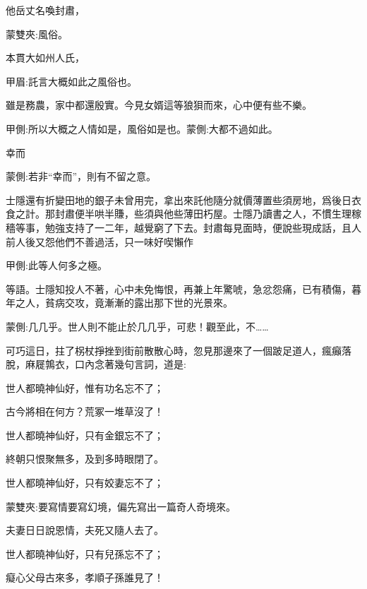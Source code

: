 \begin{parag}
    他岳丈名喚封肅，\begin{note}蒙雙夾:風俗。\end{note}本貫大如州人氏，\begin{note}甲眉:託言大概如此之風俗也。\end{note}雖是務農，家中都還殷實。今見女婿這等狼狽而來，心中便有些不樂。\begin{note}甲側:所以大概之人情如是，風俗如是也。蒙側:大都不過如此。\end{note}幸而\begin{note}蒙側:若非“幸而”，則有不留之意。\end{note}士隱還有折變田地的銀子未曾用完，拿出來託他隨分就價薄置些須房地，爲後日衣食之計。那封肅便半哄半賺，些須與他些薄田朽屋。士隱乃讀書之人，不慣生理稼穡等事，勉強支持了一二年，越覺窮了下去。封肅每見面時，便說些現成話，且人前人後又怨他們不善過活，只一味好喫懶作\begin{note}甲側:此等人何多之極。\end{note}等語。士隱知投人不著，心中未免悔恨，再兼上年驚唬，急忿怨痛，已有積傷，暮年之人，貧病交攻，竟漸漸的露出那下世的光景來。\begin{note}蒙側:几几乎。世人則不能止於几几乎，可悲！觀至此，不……\end{note}
\end{parag}


\begin{parag}
    可巧這日，拄了柺杖掙挫到街前散散心時，忽見那邊來了一個跛足道人，瘋癲落脫，麻屣鶉衣，口內念著幾句言詞，道是:
\end{parag}


\begin{poem}
    \begin{pl}世人都曉神仙好，惟有功名忘不了；\end{pl}

    \begin{pl}古今將相在何方？荒冢一堆草沒了！\end{pl}

    \begin{pl}世人都曉神仙好，只有金銀忘不了；\end{pl}

    \begin{pl}終朝只恨聚無多，及到多時眼閉了。\end{pl}

    \begin{pl}世人都曉神仙好，只有姣妻忘不了；\end{pl}
    \begin{note}蒙雙夾:要寫情要寫幻境，偏先寫出一篇奇人奇境來。\end{note}

    \begin{pl}夫妻日日說恩情，夫死又隨人去了。\end{pl}

    \begin{pl}世人都曉神仙好，只有兒孫忘不了；\end{pl}

    \begin{pl}癡心父母古來多，孝順子孫誰見了！\end{pl}
\end{poem}


